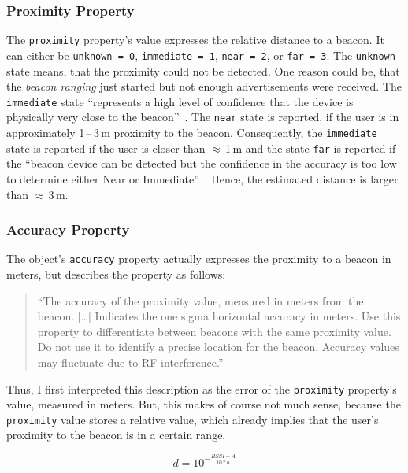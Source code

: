 \subsubsection*{Proximity Property}
The \texttt{proximity} property's value expresses the relative distance to a beacon. It can either be \texttt{unknown\,=\,0}, \texttt{immediate\,=\,1}, \texttt{near\,=\,2}, or \texttt{far\,=\,3}. The \texttt{unknown} state means, that the proximity could not be detected. One reason could be, that the \emph{beacon ranging} just started but not enough advertisements were received. The \texttt{immediate} state ``represents a high level of confidence that the device is physically very close to the beacon''~\citep{apple:getting_started}. The \texttt{near} state is reported, if the user is in approximately 1\,--\,3\,m proximity to the beacon. Consequently, the \texttt{immediate} state is reported if the user is closer than $\approx$\,1\,m and the state \texttt{far} is reported if the ``beacon device can be detected but the confidence in the accuracy is too low to determine either Near or Immediate''~\citep{apple:getting_started}. Hence, the estimated distance is larger than $\approx$\,3\,m.

\subsubsection*{Accuracy Property}
The object's \texttt{accuracy} property actually expresses the proximity to a beacon in meters, but \citet{apple:ios_doc_cl} describes the property as follows:
\begin{quote}
  ``The accuracy of the proximity value, measured in meters from the beacon.
  [\dots]
  Indicates the one sigma horizontal accuracy in meters. Use this property to differentiate between beacons with the same proximity value. Do not use it to identify a precise location for the beacon. Accuracy values may fluctuate due to RF interference.''\citep{apple:ios_doc_cl}
\end{quote}
Thus, I first interpreted this description as the error of the \texttt{proximity} property's value, measured in meters. But, this makes of course not much sense, because the \texttt{proximity} value stores a relative value, which already implies that the user's proximity to the beacon is in a certain range.

\begin{equation} \label{eq:rssiToDistanceCalc}
	d = 10^{-\frac{RSSI + A}{10 * n}}
\end{equation}

